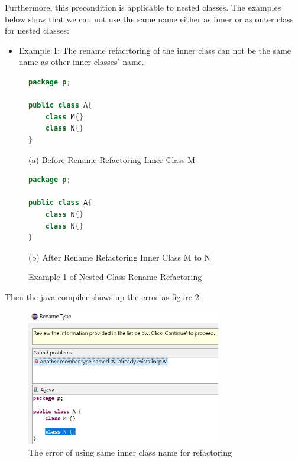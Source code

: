 Furthermore, this precondition is applicable to nested classes. The examples below show that we can not use the same name either as inner or as outer class for nested classes:

\begin{itemize}
\item Example 1: The rename refacrtoring of the inner class can not be the same name as other inner classes' name.
\end{itemize}

\begin{figure}[th]
\centering
\begin{minipage}[t]{0.45\linewidth}
\begin{lstlisting}[language=java, basicstyle=\scriptsize\ttfamily,frame=single]
package p;

public class A{	
    class M{}
    class N{}
} 
\end{lstlisting}
\tiny{(a) Before Rename Refactoring Inner Class M}
\end{minipage}
\hfill
\begin{minipage}[t]{0.45\linewidth}
\begin{lstlisting}[language=java, basicstyle=\scriptsize\ttfamily,frame=single]
package p;

public class A{	
    class N{}
    class N{}
} 
\end{lstlisting}
\tiny{(b) After Rename Refactoring Inner Class M to N}
\end{minipage}
\caption{Example 1 of Nested Class Rename Refactoring}
\label{fig:nestedclass1}
\end{figure}

Then the java compiler shows up the error as figure \ref{fig:NC1}:

\begin{figure}[H]
\centerline{\includegraphics[width=85mm,scale=0.5]{NC1.jpg}}
\caption{The error of using same inner class name for refactoring}
\label{fig:NC1}
\end{figure}

